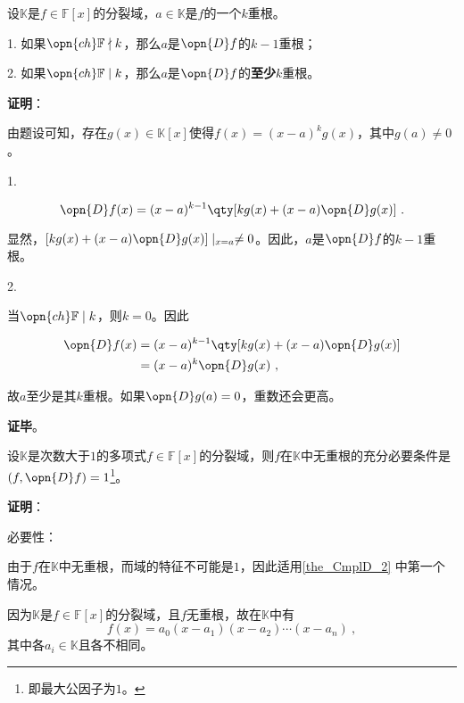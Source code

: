 \begin{theorem}{}\label{the_CmplD_2}
设$\mathbb{K}$是$f\in\mathbb{F}[x]$的分裂域，$a\in\mathbb{K}$是$f$的一个$k$重根。

1. 如果$\opn{ch}\mathbb{F}\nmid k$，那么$a$是$\opn{D}f$的$k-1$重根；

2. 如果$\opn{ch}\mathbb{F}\mid k$，那么$a$是$\opn{D}f$的\textbf{至少}$k$重根。
\end{theorem}

\textbf{证明}：

由题设可知，存在$g(x)\in\mathbb{K}[x]$使得$f(x) = (x-a)^k g(x)$，其中$g(a)\neq 0$。

1. 

\begin{equation}
\opn{D}f(x)=(x-a)^{k-1}\qty[kg(x)+(x-a)\opn{D}g(x)]~.
\end{equation}

显然，$[kg(x)+(x-a)\opn{D}g(x)]\mid_{x=a}\neq 0$。因此，$a$是$\opn{D}f$的$k-1$重根。


2. 

当$\opn{ch}\mathbb{F}\mid k$，则$k=0$。因此

\begin{equation}
\begin{aligned}
\opn{D}f(x)&=(x-a)^{k-1}\qty[kg(x)+(x-a)\opn{D}g(x)]\\
&=(x-a)^k\opn{D}g(x)~,
\end{aligned}
\end{equation}

故$a$至少是其$k$重根。如果$\opn{D}g(a)=0$，重数还会更高。

\textbf{证毕}。



\begin{corollary}{}\label{cor_CmplD_1}
设$\mathbb{K}$是次数大于$1$的多项式$f\in\mathbb{F}[x]$的分裂域，则$f$在$\mathbb{K}$中无重根的充分必要条件是$(f, \opn{D}f)=1$\footnote{即最大公因子为$1$。}。
\end{corollary}

\textbf{证明}：

必要性：

由于$f$在$\mathbb{K}$中无重根，而域的特征不可能是$1$，因此适用\autoref{the_CmplD_2} 中第一个情况。

因为$\mathbb{K}$是$f\in\mathbb{F}[x]$的分裂域，且$f$无重根，故在$\mathbb{K}$中有
\begin{equation}
f(x) = a_0(x-a_1)(x-a_2)\cdots(x-a_n)~,
\end{equation}
其中各$a_i\in\mathbb{K}$且各不相同。

